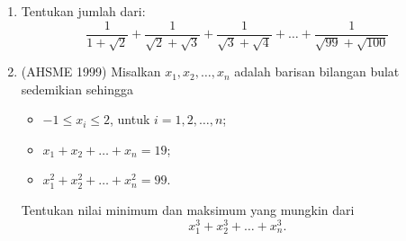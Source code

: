 \documentclass[12pt]{scrartcl}
\begin{document}
\begin{enumerate}
    \item Tentukan jumlah dari:
    \[ \frac{1}{1+\sqrt{2}} + \frac{1}{\sqrt{2}+\sqrt{3}} + \frac{1}{\sqrt{3}+\sqrt{4}} + \dots + \frac{1}{\sqrt{99}+\sqrt{100}} \]
    \item (AHSME 1999) Misalkan $x_1, x_2, \dots, x_n$ adalah barisan bilangan bulat sedemikian sehingga
    \begin{itemize}
        \item[(i)] $-1 \le x_i \le 2$, untuk $i = 1, 2, \dots, n$;
        \item[(ii)] $x_1 + x_2 + \dots + x_n = 19$;
        \item[(iii)] $x_1^2 + x_2^2 + \dots + x_n^2 = 99$.
    \end{itemize}
    Tentukan nilai minimum dan maksimum yang mungkin dari
    \[ x_1^3 + x_2^3 + \dots + x_n^3. \]
    
\end{enumerate}
\end{document}
